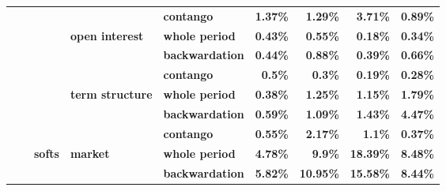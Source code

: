 \documentclass[
  authoryear,
  preprint,
  3p]{elsarticle}
\begin{document}
\begin{longtable}[t]{>{}l>{}l>{}l>{}l>{}l>{}r>{}r>{}r>{}r}
\textbf{} & \textbf{} & \textbf{} & \textbf{} & \textbf{contango} & \textcolor[HTML]{4285f4}{\textbf{1.37\%}} & \textcolor[HTML]{4285f4}{\textbf{1.29\%}} & \textcolor[HTML]{4285f4}{\textbf{3.71\%}} & \textcolor[HTML]{4285f4}{\textbf{0.89\%}}\\
\textbf{} & \textbf{} & \textbf{} & \textbf{open interest} & \textbf{whole period} & \textcolor[HTML]{4285f4}{\textbf{0.43\%}} & \textcolor[HTML]{4285f4}{\textbf{0.55\%}} & \textcolor[HTML]{4285f4}{\textbf{0.18\%}} & \textcolor[HTML]{4285f4}{\textbf{0.34\%}}\\
\addlinespace
\textbf{} & \textbf{} & \textbf{} & \textbf{} & \textbf{backwardation} & \textcolor[HTML]{4285f4}{\textbf{0.44\%}} & \textcolor[HTML]{4285f4}{\textbf{0.88\%}} & \textcolor[HTML]{4285f4}{\textbf{0.39\%}} & \textcolor[HTML]{4285f4}{\textbf{0.66\%}}\\
\textbf{} & \textbf{} & \textbf{} & \textbf{} & \textbf{contango} & \textcolor[HTML]{4285f4}{\textbf{0.5\%}} & \textcolor[HTML]{4285f4}{\textbf{0.3\%}} & \textcolor[HTML]{4285f4}{\textbf{0.19\%}} & \textcolor[HTML]{4285f4}{\textbf{0.28\%}}\\
\textbf{} & \textbf{} & \textbf{} & \textbf{term structure} & \textbf{whole period} & \textcolor[HTML]{4285f4}{\textbf{0.38\%}} & \textcolor[HTML]{4285f4}{\textbf{1.25\%}} & \textcolor[HTML]{4285f4}{\textbf{1.15\%}} & \textcolor[HTML]{4285f4}{\textbf{1.79\%}}\\
\textbf{} & \textbf{} & \textbf{} & \textbf{} & \textbf{backwardation} & \textcolor[HTML]{4285f4}{\textbf{0.59\%}} & \textcolor[HTML]{4285f4}{\textbf{1.09\%}} & \textcolor[HTML]{4285f4}{\textbf{1.43\%}} & \textcolor[HTML]{4285f4}{\textbf{4.47\%}}\\
\textbf{} & \textbf{} & \textbf{} & \textbf{} & \textbf{contango} & \textcolor[HTML]{4285f4}{\textbf{0.55\%}} & \textcolor[HTML]{4285f4}{\textbf{2.17\%}} & \textcolor[HTML]{4285f4}{\textbf{1.1\%}} & \textcolor[HTML]{4285f4}{\textbf{0.37\%}}\\
\addlinespace
\textbf{} & \textbf{} & \textbf{softs} & \textbf{market} & \textbf{whole period} & \textcolor[HTML]{4285f4}{\textbf{4.78\%}} & \textcolor[HTML]{4285f4}{\textbf{9.9\%}} & \textcolor[HTML]{4285f4}{\textbf{18.39\%}} & \textcolor[HTML]{4285f4}{\textbf{8.48\%}}\\
\textbf{} & \textbf{} & \textbf{} & \textbf{} & \textbf{backwardation} & \textcolor[HTML]{4285f4}{\textbf{5.82\%}} & \textcolor[HTML]{4285f4}{\textbf{10.95\%}} & \textcolor[HTML]{4285f4}{\textbf{15.58\%}} & \textcolor[HTML]{4285f4}{\textbf{8.44\%}}\\

\end{longtable}
\end{document}
